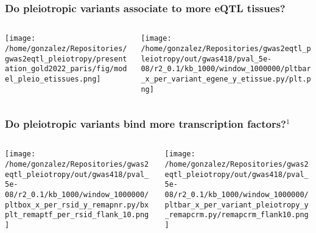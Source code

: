 \documentclass{beamer}
\begin{document}
\begin{frame}
\frametitle{Do pleiotropic variants associate to more eQTL tissues?}

\begin{columns}
\begin{column}{0.5\textwidth}
    \begin{center}
\texttt{[image: /home/gonzalez/Repositories/gwas2eqtl\_pleiotropy/presentation\_gold2022\_paris/fig/model\_pleio\_etissues.png]}
     \end{center}
\end{column}
\begin{column}{0.5\textwidth}  %
    \begin{center}
\texttt{[image: /home/gonzalez/Repositories/gwas2eqtl\_pleiotropy/out/gwas418/pval\_5e-08/r2\_0.1/kb\_1000/window\_1000000/pltbar\_x\_per\_variant\_egene\_y\_etissue.py/plt.png]}
     \end{center}
\end{column}
\end{columns}

\end{frame}

\begin{frame}
\frametitle{Do pleiotropic variants bind more transcription factors?$^1$}

\begin{columns}
\begin{column}{0.5\textwidth}
    \begin{center}
\texttt{[image: /home/gonzalez/Repositories/gwas2eqtl\_pleiotropy/out/gwas418/pval\_5e-08/r2\_0.1/kb\_1000/window\_1000000/pltbox\_x\_per\_rsid\_y\_remapnr.py/bxplt\_remaptf\_per\_rsid\_flank\_10.png]}
     \end{center}
\end{column}
\begin{column}{0.5\textwidth}  %
    \begin{center}
\texttt{[image: /home/gonzalez/Repositories/gwas2eqtl\_pleiotropy/out/gwas418/pval\_5e-08/r2\_0.1/kb\_1000/window\_1000000/pltbar\_x\_per\_variant\_pleiotropy\_y\_remapcrm.py/remapcrm\_flank10.png]}
     \end{center}
\end{column}
\end{columns}

\let\thefootnote\relax{}

\end{frame}
\end{document}
